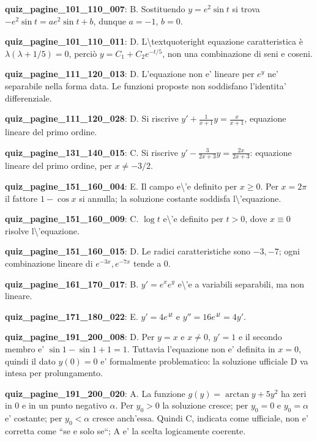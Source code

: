 \documentclass[11pt,a4paper]{article}
\newcounter{quiz}
\begin{document}
\noindent\textbf{quiz\_pagine\_101\_110\_007}: B. Sostituendo $y=e^2\sin t$ si trova $-e^2\sin t=ae^2\sin t+b$, dunque $a=-1$, $b=0$.\par\medskip
\noindent\textbf{quiz\_pagine\_101\_110\_011}: D. L\textbackslash{}textquoteright equazione caratteristica è $\lambda(\lambda+1/5)=0$, perciò $y=C_1+C_2e^{-t/5}$, non una combinazione di seni e coseni.\par\medskip
\noindent\textbf{quiz\_pagine\_111\_120\_013}: D. L'equazione non e' lineare per $e^y$ ne' separabile nella forma data. Le funzioni proposte non soddisfano l'identita' differenziale.\par\medskip
\noindent\textbf{quiz\_pagine\_111\_120\_028}: D. Si riscrive $y'+\frac1{x+1}y=\frac{x}{x+1}$, equazione lineare del primo ordine.\par\medskip
\noindent\textbf{quiz\_pagine\_131\_140\_015}: C. Si riscrive $y\prime-\frac{3}{2x+3}y=\frac{2x}{2x+3}$: equazione lineare del primo ordine, per $x\neq-3/2$.\par\medskip
\noindent\textbf{quiz\_pagine\_151\_160\_004}: E. Il campo e\textbackslash{}'e definito per $x\geq0$. Per $x=2\pi$ il fattore $1-\cos x$ si annulla; la soluzione costante soddisfa l\textbackslash{}'equazione.\par\medskip
\noindent\textbf{quiz\_pagine\_151\_160\_009}: C. $\log t$ e\textbackslash{}'e definito per $t>0$, dove $x\equiv0$ risolve l\textbackslash{}'equazione.\par\medskip
\noindent\textbf{quiz\_pagine\_151\_160\_015}: D. Le radici caratteristiche sono $-3,-7$; ogni combinazione lineare di $e^{-3x},e^{-7x}$ tende a $0$.\par\medskip
\noindent\textbf{quiz\_pagine\_161\_170\_017}: B. $y'=e^xe^y$ e\textbackslash{}'e a variabili separabili, ma non lineare.\par\medskip
\noindent\textbf{quiz\_pagine\_171\_180\_022}: E. $y'=4e^{4t}$ e $y''=16e^{4t}=4y'$.\par\medskip
\noindent\textbf{quiz\_pagine\_191\_200\_008}: D. Per $y=x$ e $x\ne0$, $y'=1$ e il secondo membro e' $\sin1-\sin1+1=1$. Tuttavia l'equazione non e' definita in $x=0$, quindi il dato $y(0)=0$ e' formalmente problematico: la soluzione ufficiale D va intesa per prolungamento.\par\medskip
\noindent\textbf{quiz\_pagine\_191\_200\_020}: A. La funzione $g(y)=\arctan y+5y^2$ ha zeri in $0$ e in un punto negativo $\alpha$. Per $y_0>0$ la soluzione cresce; per $y_0=0$ e $y_0=\alpha$ e' costante; per $y_0<\alpha$ cresce anch'essa. Quindi C, indicata come ufficiale, non e' corretta come ``se e solo se``; A e' la scelta logicamente coerente.\par\medskip
\end{document}
